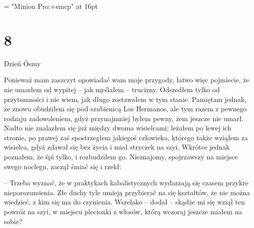 






\font\sectionFont = "Minion Pro:+smcp" at 16pt

\outer{}


\section {\bf 8}\quad Dzień Ósmy

Ponieważ mam zaszczyt opowiadać wam moje przygody, łatwo więc
pojmiecie, że nie umarłem od wypitej – jak myślałem –
trucizny. Odszedłem tylko od przytomności i nie wiem, jak długo
zostawałem w tym stanie. Pamiętam jednak, że znowu obudziłem się pod
szubienicą Los Hermanos, ale tym razem z pewnego rodzaju zadowoleniem,
gdyż przynajmniej byłem pewny, żem jeszcze nie umarł. Nadto nie
znalazłem się już między dwoma wisielcami; leżałem po lewej ich
stronie, po prawej zaś spostrzegłem jakiegoś człowieka, którego także
wziąłem za wisielca, gdyż zdawał się bez życia i miał stryczek na
szyi. Wkrótce jednak poznałem, że śpi tylko, i rozbudziłem
go. Nieznajomy, spojrzawszy na miejsce swego noclegu, zaczął śmiać się
i rzekł:

– Trzeba wyznać, że w praktykach kabalistycznych wydarzają się czasem
przykre nieporozumienia. Złe duchy tyle umieją przybierać na się
kształtów, że nie można wiedzieć, z kim się ma do czynienia. Wszelako
– dodał – skądże mi się wziął ten powróz na szyi, w miejscu plecionki
z włosów, którą wczoraj jeszcze miałem na sobie?

